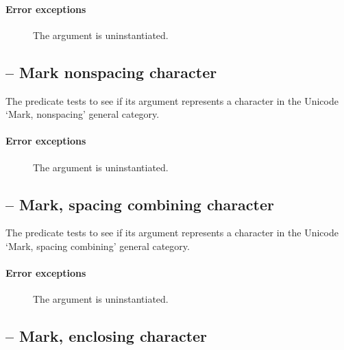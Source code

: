 \paragraph{Error exceptions}
\begin{description}
\item[]
The argument is uninstantiated.
\end{description}

\subsection{ -- Mark nonspacing character}
\label{chars:isMnChar}

The  predicate tests to see if its  argument represents a character in the Unicode `Mark, nonspacing' general category. 
        
\paragraph{Error exceptions}
\begin{description}
\item[]
The argument is uninstantiated.
\end{description}

\subsection{ -- Mark, spacing combining character}
\label{chars:isMcChar}

The  predicate tests to see if its  argument represents a character in the Unicode `Mark, spacing combining' general category. 
        
\paragraph{Error exceptions}
\begin{description}
\item[]
The argument is uninstantiated.
\end{description}

\subsection{ -- Mark, enclosing character}
\label{chars:isMeChar}

